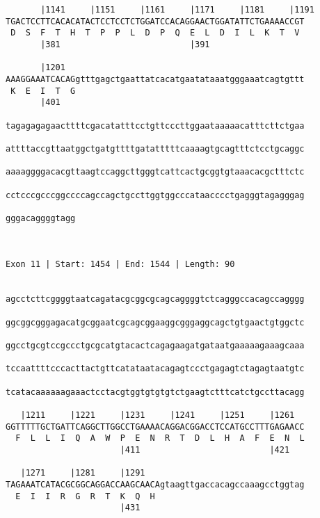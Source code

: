 \documentclass{article}
\begin{document}
\begin{Verbatim}
       |1141     |1151     |1161     |1171     |1181     |1191
TGACTCCTTCACACATACTCCTCCTCTGGATCCACAGGAACTGGATATTCTGAAAACCGT
 D  S  F  T  H  T  P  P  L  D  P  Q  E  L  D  I  L  K  T  V 
       |381                          |391                   
  
       |1201                                                
AAAGGAAATCACAGgtttgagctgaattatcacatgaatataaatgggaaatcagtgttt
 K  E  I  T  G                                              
       |401                                                 
  
tagagagagaacttttcgacatatttcctgttcccttggaataaaaacatttcttctgaa
                                                            
attttaccgttaatggctgatgttttgatatttttcaaaagtgcagtttctcctgcaggc
                                                            
aaaaggggacacgttaagtccaggcttgggtcattcactgcggtgtaaacacgctttctc
                                                            
cctcccgcccggccccagccagctgccttggtggcccataacccctgagggtagagggag
                                                            
gggacaggggtagg
              
              
 
Exon 11 | Start: 1454 | End: 1544 | Length: 90


agcctcttcggggtaatcagatacgcggcgcagcaggggtctcagggccacagccagggg
                                                            
ggcggcgggagacatgcggaatcgcagcggaaggcgggaggcagctgtgaactgtggctc
                                                            
ggcctgcgtccgccctgcgcatgtacactcagagaagatgataatgaaaaagaaagcaaa
                                                            
tccaattttcccacttactgttcatataatacagagtccctgagagtctagagtaatgtc
                                                            
tcatacaaaaaagaaactcctacgtggtgtgtgtctgaagtctttcatctgccttacagg
                                                            
   |1211     |1221     |1231     |1241     |1251     |1261  
GGTTTTTGCTGATTCAGGCTTGGCCTGAAAACAGGACGGACCTCCATGCCTTTGAGAACC
  F  L  L  I  Q  A  W  P  E  N  R  T  D  L  H  A  F  E  N  L
                       |411                          |421   
  
   |1271     |1281     |1291                                
TAGAAATCATACGCGGCAGGACCAAGCAACAgtaagttgaccacagccaaagcctggtag
  E  I  I  R  G  R  T  K  Q  H                              
                       |431                                 
  

\end{Verbatim}
\end{document}
